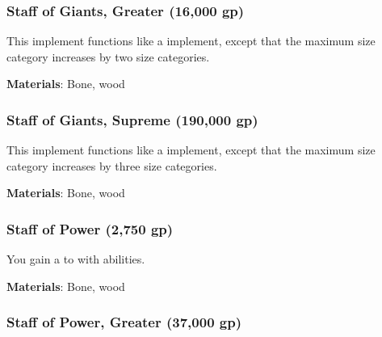 \lowercase{\hypertarget{item:Staff of Giants, Greater}{}}\label{item:Staff of Giants, Greater}
\hypertarget{item:Staff of Giants, Greater}{\subsubsection{Staff of Giants, Greater\hfill{} (16,000 gp)}}

This implement functions like a  implement, except that the maximum size category increases by two size categories.



\vspace{0.25em}
\textbf{Materials}: Bone, wood


\lowercase{\hypertarget{item:Staff of Giants, Supreme}{}}\label{item:Staff of Giants, Supreme}
\hypertarget{item:Staff of Giants, Supreme}{\subsubsection{Staff of Giants, Supreme\hfill{} (190,000 gp)}}

This implement functions like a  implement, except that the maximum size category increases by three size categories.



\vspace{0.25em}
\textbf{Materials}: Bone, wood


\lowercase{\hypertarget{item:Staff of Power}{}}\label{item:Staff of Power}
\hypertarget{item:Staff of Power}{\subsubsection{Staff of Power\hfill{} (2,750 gp)}}

You gain a   to  with  abilities.



\vspace{0.25em}
\textbf{Materials}: Bone, wood


\lowercase{\hypertarget{item:Staff of Power, Greater}{}}\label{item:Staff of Power, Greater}
\hypertarget{item:Staff of Power, Greater}{\subsubsection{Staff of Power, Greater\hfill{} (37,000 gp)}}

